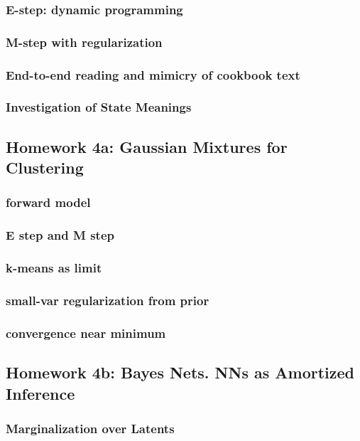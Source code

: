 \documentclass[12pt]{article}
\begin{document}
      \subsubsection*{E-step: dynamic programming}
      \subsubsection*{M-step with regularization}
      \subsubsection*{End-to-end reading and mimicry of cookbook text}
      \subsubsection*{Investigation of State Meanings}
    \newpage

    \subsection*{Homework 4a: Gaussian Mixtures for Clustering} %
      \subsubsection*{forward model}
      \subsubsection*{E step and M step}
      \subsubsection*{k-means as limit}
      \subsubsection*{small-var regularization from prior}
      \subsubsection*{convergence near minimum}
    \newpage

    \subsection*{Homework 4b: Bayes Nets.  NNs as Amortized Inference}
      \subsubsection*{Marginalization over Latents}
\end{document}
